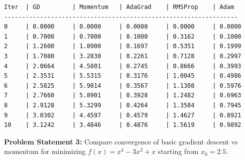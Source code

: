 \documentclass[
  letterpaper,
  DIV=11,
  numbers=noendperiod]{scrreprt}
\begin{document}
\begin{verbatim}
Iter  | GD         | Momentum   | AdaGrad    | RMSProp    | Adam      
-----------------------------------------------------------------
0     | 0.0000     | 0.0000     | 0.0000     | 0.0000     | 0.0000    
1     | 0.7000     | 0.7000     | 0.1000     | 0.3162     | 0.1000    
2     | 1.2600     | 1.8900     | 0.1697     | 0.5351     | 0.1999    
3     | 1.7080     | 3.2830     | 0.2261     | 0.7128     | 0.2997    
4     | 2.0664     | 4.5801     | 0.2745     | 0.8666     | 0.3993    
5     | 2.3531     | 5.5315     | 0.3176     | 1.0045     | 0.4986    
6     | 2.5825     | 5.9814     | 0.3567     | 1.1308     | 0.5976    
7     | 2.7660     | 5.8901     | 0.3928     | 1.2482     | 0.6963    
8     | 2.9128     | 5.3299     | 0.4264     | 1.3584     | 0.7945    
9     | 3.0302     | 4.4597     | 0.4579     | 1.4627     | 0.8921    
10    | 3.1242     | 3.4846     | 0.4876     | 1.5619     | 0.9892    
\end{verbatim}

\textbf{Problem Statement 3:} Compare convergence of basic gradient
descent vs momentum for minimizing \(f(x) = x^4 - 3x^2 + x\) starting
from \(x_0 = 2.5\).
\end{document}
